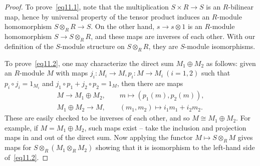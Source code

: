 \documentclass[12pt,reqno]{book}%
\theoremstyle{definition}
\theoremstyle{remark}
\theoremstyle{theorem}
\theoremstyle{remark}
\begin{document}
\begin{proof}%
    To prove~\eqref{eq11.1}, note that the multiplication $S \times R \to S$ is an $R$-bilinear map, hence by universal property of the tensor product induces an $R$-module homomorphism $S \otimes_{R} R \to S$.
    On the other hand, $s \to s \otimes 1$ is an $R$-module homomorphism $S \to S \otimes_{R} R$, and these maps are inverses of each other.
    With our definition of the $S$-module structure on $S \otimes_{R} R$, they are $S$-module isomorphisms.

    To prove~\eqref{eq11.2}, one may characterize the direct sum $M_1 \oplus M_2$ as follows: given an $R$-module $M$ with maps $j_i : M_i \to M, p_i : M \to M_i \ (i = 1, 2)$ such that $p_i \circ j_i = 1_{M_i}$ and $j_1 \circ p_1 + j_2 \circ p_2 = 1_M$, then there are maps
    \begin{gather*}
        M \to M_1 \oplus M_2, \qquad m \mapsto (p_1(m), p_2(m)), \\
        M_1 \oplus M_2 \to M, \qquad (m_1, m_2) \mapsto i_1m_1 +  i_2m_2.
    \end{gather*}
    These are easily checked to be inverses of each other, and so $M \cong M_1 \oplus M_2$.
    For example, if $M = M_1 \oplus M_2$, such maps exist -- take the inclusion and projection maps in and out of the direct sum.
    Now applying the functor $M \mapsto S \otimes_{R} M$ gives maps for $S \otimes_{R} (M_1 \otimes_{R} M_2)$ showing that it is isomorphism to the left-hand side of~\eqref{eq11.2}.


\end{proof}
\end{document}
